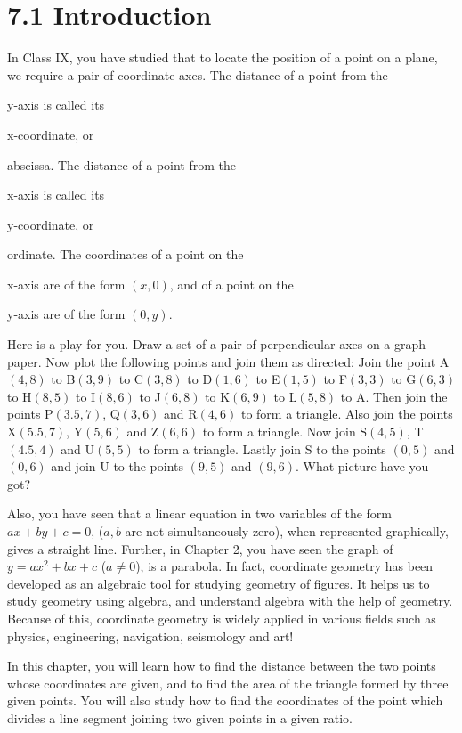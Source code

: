 \documentclass[a4paper,12pt]{article}
\begin{document}
\vspace{0.6cm}

\section*{\textcolor{cyan!80!blue}{7.1 Introduction}}

In Class IX, you have studied that to locate the position of a point on a plane, we require a pair of coordinate axes. The distance of a point from the \item{y}-axis is called its \item{x-coordinate}, or \item{abscissa}. The distance of a point from the \item{x}-axis is called its \item{y-coordinate}, or \item{ordinate}. The coordinates of a point on the \item{x}-axis are of the form $(x, 0)$, and of a point on the \item{y}-axis are of the form $(0, y)$.

Here is a play for you. Draw a set of a pair of perpendicular axes on a graph paper. Now plot the following points and join them as directed: Join the point A$(4, 8)$ to B$(3, 9)$ to C$(3, 8)$ to D$(1, 6)$ to E$(1, 5)$ to F$(3, 3)$ to G$(6, 3)$ to H$(8, 5)$ to I$(8, 6)$ to J$(6, 8)$ to K$(6, 9)$ to L$(5, 8)$ to A. Then join the points P$(3.5, 7)$, Q$(3, 6)$ and R$(4, 6)$ to form a triangle. Also join the points X$(5.5, 7)$, Y$(5, 6)$ and Z$(6, 6)$ to form a triangle. Now join S$(4, 5)$, T$(4.5, 4)$ and U$(5, 5)$ to form a triangle. Lastly join S to the points $(0, 5)$ and $(0, 6)$ and join U to the points $(9, 5)$ and $(9, 6)$. What picture have you got?

Also, you have seen that a linear equation in two variables of the form $ax + by + c = 0$, ($a, b$ are not simultaneously zero), when represented graphically, gives a straight line. Further, in Chapter 2, you have seen the graph of $y = ax^2 + bx + c$ ($a \ne 0$), is a parabola. In fact, coordinate geometry has been developed as an algebraic tool for studying geometry of figures. It helps us to study geometry using algebra, and understand algebra with the help of geometry. Because of this, coordinate geometry is widely applied in various fields such as physics, engineering, navigation, seismology and art!

In this chapter, you will learn how to find the distance between the two points whose coordinates are given, and to find the area of the triangle formed by three given points. You will also study how to find the coordinates of the point which divides a line segment joining two given points in a given ratio.
\end{document}
